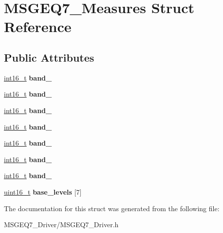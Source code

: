 \hypertarget{structMSGEQ7__Measures}{}\section{M\+S\+G\+E\+Q7\+\_\+\+Measures Struct Reference}
\label{structMSGEQ7__Measures}
\subsection*{Public Attributes}
\begin{DoxyCompactItemize}
\item 
\mbox{\label{structMSGEQ7__Measures_abf7a7389a3e93776cdcb12b21c7857ee}} 
\hyperlink{vl53l0x__types_8h_aa343fa3b3d06292b959ffdd4c4703b06}{int16\+\_\+t} {\bfseries band\+\_}
\item 
\mbox{\label{structMSGEQ7__Measures_adb0257b35822e14d3e178b8a479cfb41}} 
\hyperlink{vl53l0x__types_8h_aa343fa3b3d06292b959ffdd4c4703b06}{int16\+\_\+t} {\bfseries band\+\_}
\item 
\mbox{\label{structMSGEQ7__Measures_af1e724e82ceae527b9f5d28fdd5d4280}} 
\hyperlink{vl53l0x__types_8h_aa343fa3b3d06292b959ffdd4c4703b06}{int16\+\_\+t} {\bfseries band\+\_}
\item 
\mbox{\label{structMSGEQ7__Measures_a4a385d30f0900c30ac466feb5562f0cf}} 
\hyperlink{vl53l0x__types_8h_aa343fa3b3d06292b959ffdd4c4703b06}{int16\+\_\+t} {\bfseries band\+\_}
\item 
\mbox{\label{structMSGEQ7__Measures_a442019a7bf80453d3d0f810f0070be70}} 
\hyperlink{vl53l0x__types_8h_aa343fa3b3d06292b959ffdd4c4703b06}{int16\+\_\+t} {\bfseries band\+\_}
\item 
\mbox{\label{structMSGEQ7__Measures_a0343968e95e0ce21e3ce20a67fd1f9e5}} 
\hyperlink{vl53l0x__types_8h_aa343fa3b3d06292b959ffdd4c4703b06}{int16\+\_\+t} {\bfseries band\+\_}
\item 
\mbox{\label{structMSGEQ7__Measures_a0cdeb7acb6506501e0f4712f2736b621}} 
\hyperlink{vl53l0x__types_8h_aa343fa3b3d06292b959ffdd4c4703b06}{int16\+\_\+t} {\bfseries band\+\_}
\item 
\mbox{\label{structMSGEQ7__Measures_acde0b37f97ff786cbf190b430f54e356}} 
\hyperlink{vl53l0x__types_8h_a273cf69d639a59973b6019625df33e30}{uint16\+\_\+t} {\bfseries base\+\_\+levels} \mbox{[}7\mbox{]}
\end{DoxyCompactItemize}


The documentation for this struct was generated from the following file\+:\begin{DoxyCompactItemize}
\item 
M\+S\+G\+E\+Q7\+\_\+\+Driver/M\+S\+G\+E\+Q7\+\_\+\+Driver.\+h\end{DoxyCompactItemize}
